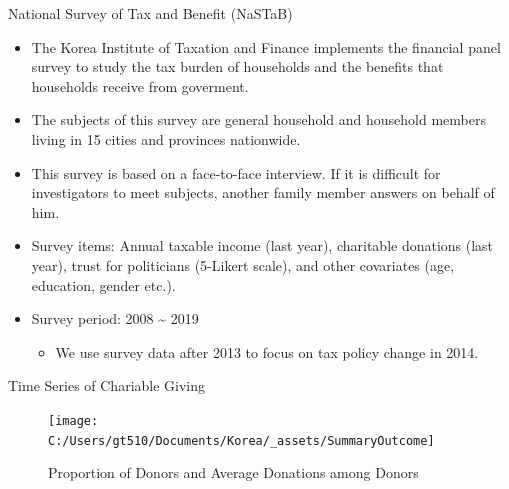\documentclass[
  ignorenonframetext,
]{beamer}
\providecommand{\tightlist}{%
  \setlength{\itemsep}{0pt}\setlength{\parskip}{0pt}}
\begin{document}
\begin{frame}{National Survey of Tax and Benefit (NaSTaB)}
\protect\hypertarget{national-survey-of-tax-and-benefit-nastab}{}

\begin{itemize}
\tightlist
\item
  The Korea Institute of Taxation and Finance implements the financial
  panel survey to study the tax burden of households and the benefits
  that households receive from goverment.
\item
  The subjects of this survey are general household and household
  members living in 15 cities and provinces nationwide.
\item
  This survey is based on a face-to-face interview. If it is difficult
  for investigators to meet subjects, another family member answers on
  behalf of him.
\item
  Survey items: Annual taxable income (last year), charitable donations
  (last year), trust for politicians (5-Likert scale), and other
  covariates (age, education, gender etc.).
\item
  Survey period: 2008 \textasciitilde{} 2019

  \begin{itemize}
  \tightlist
  \item
    We use survey data after 2013 to focus on tax policy change in 2014.
  \end{itemize}
\end{itemize}

\end{frame}

\begin{frame}{Time Series of Chariable Giving}
\protect\hypertarget{time-series-of-chariable-giving}{}

\begin{figure}
\texttt{[image: C:/Users/gt510/Documents/Korea/\_assets/SummaryOutcome]} \caption{Proportion of Donors and Average Donations among Donors}\label{fig:unnamed-chunk-1}
\end{figure}

\end{frame}
\end{document}
